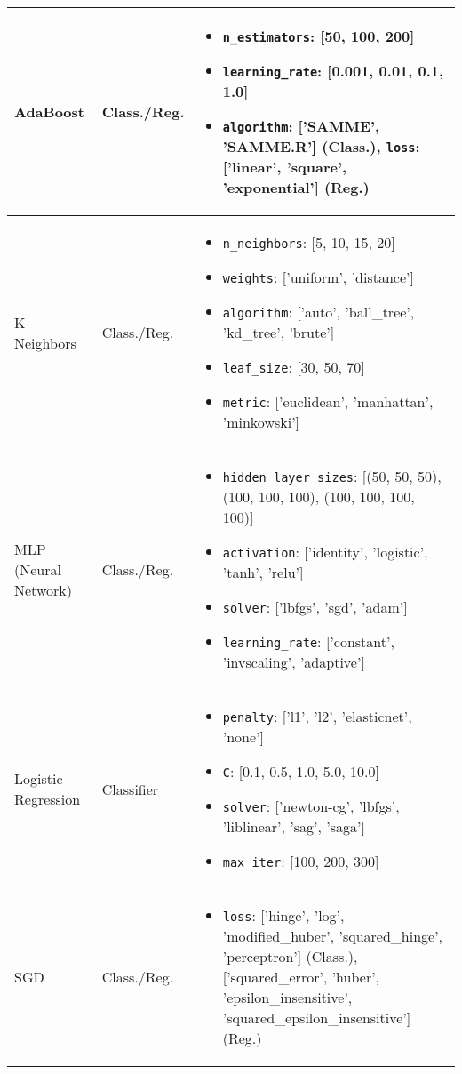\begin{longtable}{|>{\raggedright}p{2cm}|>{\raggedright}p{3cm}|>{\raggedright\arraybackslash}p{8cm}|}
\hline
AdaBoost & Class./Reg. & 
\begin{itemize}
    \item \texttt{n\_estimators}: [50, 100, 200]
    \item \texttt{learning\_rate}: [0.001, 0.01, 0.1, 1.0]
    \item \texttt{algorithm}: ['SAMME', 'SAMME.R'] (Class.), \texttt{loss}: ['linear', 'square', 'exponential'] (Reg.)
\end{itemize} \\
\hline
K-Neighbors & Class./Reg. & 
\begin{itemize}
    \item \texttt{n\_neighbors}: [5, 10, 15, 20]
    \item \texttt{weights}: ['uniform', 'distance']
    \item \texttt{algorithm}: ['auto', 'ball\_tree', 'kd\_tree', 'brute']
    \item \texttt{leaf\_size}: [30, 50, 70]
    \item \texttt{metric}: ['euclidean', 'manhattan', 'minkowski']
\end{itemize} \\
\hline
MLP (Neural Network) & Class./Reg. & 
\begin{itemize}
    \item \texttt{hidden\_layer\_sizes}: [(50, 50, 50), (100, 100, 100), (100, 100, 100, 100)]
    \item \texttt{activation}: ['identity', 'logistic', 'tanh', 'relu']
    \item \texttt{solver}: ['lbfgs', 'sgd', 'adam']
    \item \texttt{learning\_rate}: ['constant', 'invscaling', 'adaptive']
\end{itemize} \\
\hline
Logistic Regression & Classifier & 
\begin{itemize}
    \item \texttt{penalty}: ['l1', 'l2', 'elasticnet', 'none']
    \item \texttt{C}: [0.1, 0.5, 1.0, 5.0, 10.0]
    \item \texttt{solver}: ['newton-cg', 'lbfgs', 'liblinear', 'sag', 'saga']
    \item \texttt{max\_iter}: [100, 200, 300]
\end{itemize} \\
\hline
SGD & Class./Reg. & 
\begin{itemize}
    \item \texttt{loss}: ['hinge', 'log', 'modified\_huber', 'squared\_hinge', 'perceptron'] (Class.), ['squared\_error', 'huber', 'epsilon\_insensitive', 'squared\_epsilon\_insensitive'] (Reg.)

\end{itemize}
\end{longtable}
